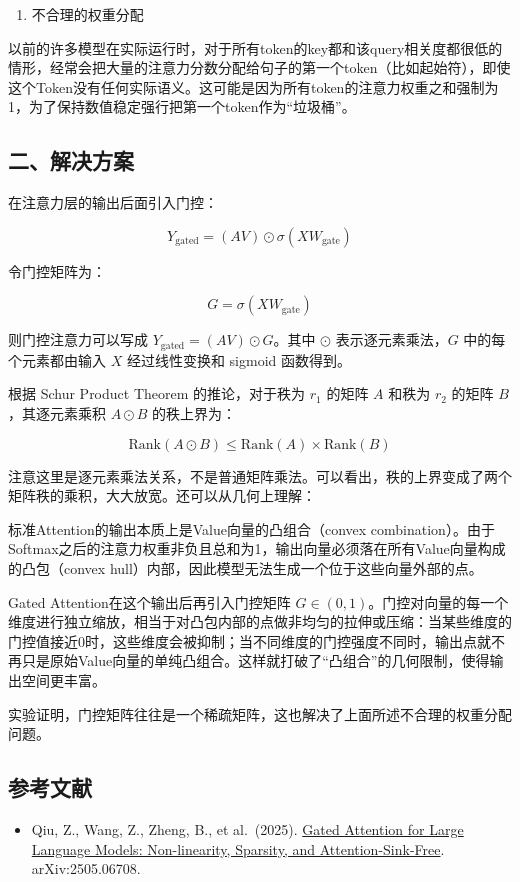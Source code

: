 \begin{enumerate}
\def\labelenumi{\arabic{enumi}.}
\setcounter{enumi}{1}
\tightlist
\item
  不合理的权重分配
\end{enumerate}

以前的许多模型在实际运行时，对于所有token的key都和该query相关度都很低的情形，经常会把大量的注意力分数分配给句子的第一个token（比如起始符），即使这个Token没有任何实际语义。这可能是因为所有token的注意力权重之和强制为1，为了保持数值稳定强行把第一个token作为``垃圾桶''。

\hypertarget{ux4e8cux89e3ux51b3ux65b9ux6848-1}{%
\subsection{二、解决方案}\label{ux4e8cux89e3ux51b3ux65b9ux6848-1}}

在注意力层的输出后面引入门控：

\[
Y_{\mathrm{gated}}=(AV)\odot\sigma(XW_{\mathrm{gate}})
\]

令门控矩阵为：

\[
G=\sigma(XW_{\mathrm{gate}})
\]

则门控注意力可以写成 \(Y_{\mathrm{gated}}=(AV)\odot G\)。其中 \(\odot\) 表示逐元素乘法，\(G\) 中的每个元素都由输入 \(X\) 经过线性变换和 sigmoid 函数得到。

根据 Schur Product Theorem 的推论，对于秩为 \(r_1\) 的矩阵 \(A\) 和秩为 \(r_2\) 的矩阵 \(B\)，其逐元素乘积 \(A\odot B\) 的秩上界为：

\[
\mathrm{Rank}(A\odot B)\le \mathrm{Rank}(A)\times \mathrm{Rank}(B)
\]

注意这里是逐元素乘法关系，不是普通矩阵乘法。可以看出，秩的上界变成了两个矩阵秩的乘积，大大放宽。还可以从几何上理解：

标准Attention的输出本质上是Value向量的凸组合（convex combination）。由于Softmax之后的注意力权重非负且总和为1，输出向量必须落在所有Value向量构成的凸包（convex hull）内部，因此模型无法生成一个位于这些向量外部的点。

Gated Attention在这个输出后再引入门控矩阵 \(G\in(0,1)\)。门控对向量的每一个维度进行独立缩放，相当于对凸包内部的点做非均匀的拉伸或压缩：当某些维度的门控值接近0时，这些维度会被抑制；当不同维度的门控强度不同时，输出点就不再只是原始Value向量的单纯凸组合。这样就打破了``凸组合''的几何限制，使得输出空间更丰富。

实验证明，门控矩阵往往是一个稀疏矩阵，这也解决了上面所述不合理的权重分配问题。

\hypertarget{ux53c2ux8003ux6587ux732e-98}{%
\subsection{参考文献}\label{ux53c2ux8003ux6587ux732e-98}}

\begin{itemize}
\tightlist
\item
  Qiu, Z., Wang, Z., Zheng, B., et al.~(2025). \href{https://arxiv.org/abs/2505.06708}{Gated Attention for Large Language Models: Non-linearity, Sparsity, and Attention-Sink-Free}. arXiv:2505.06708.
\end{itemize}

\clearpage
